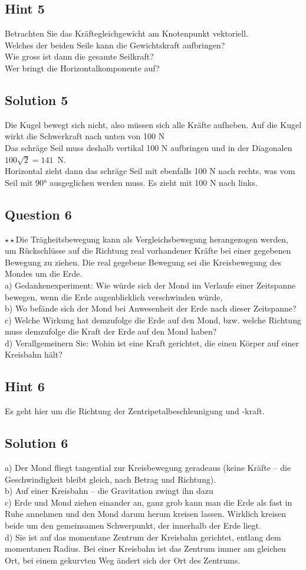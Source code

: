 \documentclass{article}
\begin{document}
\subsection*{Hint 5}
Betrachten Sie das Kräftegleichgewicht am Knotenpunkt vektoriell. \\
Welches der beiden Seile kann die Gewichtskraft aufbringen? \\
Wie gross ist dann die gesamte Seilkraft? \\
Wer bringt die Horizontalkomponente auf?
\subsection*{Solution 5}
Die Kugel bewegt sich nicht, also müssen sich alle Kräfte aufheben.
Auf die Kugel wirkt die Schwerkraft nach unten von 100 N\\
Das schräge Seil muss deshalb vertikal 100 N aufbringen und in der Diagonalen $100 \sqrt{2} = 141$~N.\\
Horizontal zieht dann das schräge Seil mit ebenfalls 100 N nach rechts, was vom Seil mit 90° ausgeglichen werden muss. Es zieht mit 100 N nach links.
\subsection*{Question 6}
$\star\star$Die Trägheitsbewegung kann als Vergleichsbewegung herangezogen werden, um Rückschlüsse auf die Richtung real vorhandener Kräfte bei einer gegebenen Bewegung zu ziehen. Die real gegebene Bewegung sei die Kreisbewegung des Mondes um die Erde.\\
a) Gedankenexperiment: Wie würde sich der Mond im Verlaufe einer Zeitspanne bewegen, wenn die Erde augenblicklich verschwinden würde,\\
b) Wo befände sich der Mond bei Anwesenheit der Erde nach dieser Zeitspanne?\\
c) Welche Wirkung hat demzufolge die Erde auf den Mond, bzw. welche Richtung muss demzufolge die Kraft der Erde auf den Mond haben?\\
d) Verallgemeinern Sie: Wohin ist eine Kraft gerichtet, die einen Körper auf einer Kreisbahn hält?
\subsection*{Hint 6}
Es geht hier um die Richtung der Zentripetalbeschleunigung und -kraft.
\subsection*{Solution 6}
a) Der Mond fliegt tangential zur Kreisbewegung geradeaus (keine Kräfte – die Geschwindigkeit bleibt gleich, nach Betrag und Richtung).\\
b) Auf einer Kreisbahn – die Gravitation zwingt ihn dazu\\
c) Erde und Mond ziehen einander an, ganz grob kann man die Erde als fast in Ruhe annehmen und den Mond darum herum kreisen lassen. Wirklich kreisen beide um den gemeinsamen Schwerpunkt, der innerhalb der Erde liegt. \\
d) Sie ist auf das momentane Zentrum der Kreisbahn gerichtet, entlang dem momentanen Radius. Bei einer Kreisbahn ist das Zentrum immer am gleichen Ort, bei einem gekurvten Weg ändert sich der Ort des Zentrums.
\end{document}
